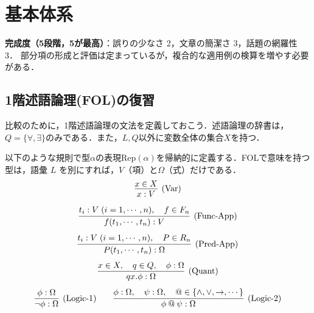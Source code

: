 \documentclass[../../main-detail.tex]{subfiles}
\begin{document}
\section{基本体系}
\begin{leftwavybox}
\textbf{完成度（5段階，5が最高）}：誤りの少なさ 2，文章の簡潔さ 3，話題の網羅性 3．
部分項の形成と評価は定まっているが，複合的な適用例の検算を増やす必要がある．
\end{leftwavybox}
\subsection{1階述語論理(FOL)の復習}
比較のために，1階述語論理の文法を定義しておこう．述語論理の辞書は，$Q = \{\forall, \exists\}$のみである．また，$L,Q$以外に変数全体の集合$X$を持つ．
\begin{definition}[FOLの文法]
    以下のような規則で型$\alpha$の表現$\mathrm{Rep}(\alpha)$を帰納的に定義する．FOLで意味を持つ型は，語彙 $L$ を別にすれば，$V$（項）と$\Omega$（式）だけである．
    \[
    \infer[\text{(Var)}]{
        x: V
    }{
        x \in X
    }
    \]
    \[
    \infer[\text{(Func-App)}]{
        f(t_1, \cdots, t_n): V
    }{
        t_i : V\; (i=1,\cdots,n),\quad f \in F_n
    }
    \]
    \[
    \infer[\text{(Pred-App)}]{
        P(t_1, \cdots, t_n): \Omega
    }{
        t_i : V\; (i=1,\cdots,n),\quad P \in R_n
    }
    \]
    \[
    \infer[\text{(Quant)}]{
         q x.\phi: \Omega
    }{
         x\in X,\quad q\in Q,\quad \phi: \Omega
    }
    \]
    \[
    \infer[\text{(Logic-1)}]{
         \lnot\phi: \Omega
    }{
         \phi: \Omega
    } 
    \qquad
    \infer[\text{(Logic-2)}]{
         \phi \mathbin{@} \psi: \Omega
    }{
         \phi: \Omega,\quad  \psi: \Omega,\quad @\in \{\land, \lor, \to, \cdots\}
    }
    \]
\end{definition}
\end{document}
